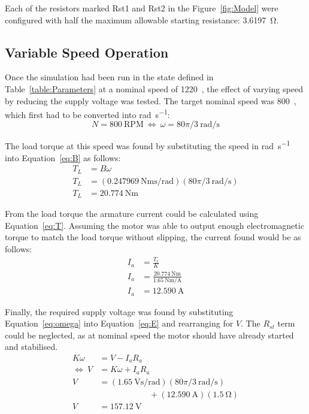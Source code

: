\documentclass[a4paper,11pt,twocolumn]{article}
\newcommand{\V}{\si{\volt}\xspace}
\newcommand{\A}{\si{\ampere}\xspace}
\newcommand{\Ohm}{\si{\ohm}\xspace}
\newcommand{\Nm}{\si{\newton\metre}\xspace}
\newcommand{\rps}{\si{\radian\per\second}\xspace}
\newcommand{\Vspr}{\si{\volt\second\per\radian}\xspace}
\newcommand{\NmpA}{\si{\newton\metre\per\ampere}\xspace}
\newcommand{\Nmspr}{\si{\newton\metre\second\per\radian}\xspace}
\newcommand{\RPM}{\text{RPM}\xspace}
\begin{document}
Each of the resistors marked Rst1 and Rst2 in the Figure~\vref{fig:Model} were 
configured with half the maximum allowable starting resistance: 3.6197~\Ohm.

\subsection{Variable Speed Operation}

Once the simulation had been run in the state defined in 
Table~\ref{table:Parameters} at a nominal speed of 1220~\RPM, the effect of 
varying speed by reducing the supply voltage was tested. The target nominal 
speed was 800~\RPM, which first had to be converted into \rps:
\begin{equation*}
    N = 800~\RPM~\Leftrightarrow~\omega = 80\pi/3~\rps
\end{equation*}

The load torque at this speed was found by substituting the speed in \rps into 
Equation~\vref{eq:B} as follows:
\begin{align*}
    T_L &= B\omega \\
    T_L &= (0.247969~\Nmspr)(80\pi/3~\rps) \\
    T_L &= 20.774~\Nm
\end{align*}

From the load torque the armature current could be calculated using 
Equation~\vref{eq:T}. Assuming the motor was able to output enough 
electromagnetic torque to match the load torque without slipping, the current 
found would be as follows:
\begin{align*}
    I_a &= \frac{T_e}{K} \\
    I_a &= \frac{20.774~\Nm}{1.65~\NmpA} \\
    I_a &= 12.590~\A
\end{align*}

Finally, the required supply voltage was found by substituting 
Equation~\ref{eq:omega} into Equation~\ref{eq:E} and rearranging for $V$. The 
$R_{st}$ term could be neglected, as at nominal speed the motor should have 
already started and stabilised.
\begin{align*}
    K \omega &= V - I_a R_a \\
    \Leftrightarrow~V &= K \omega + I_a R_a \\
    V &= (1.65~\Vspr)(80\pi/3~\rps) \\
        &\hspace{6em}+ (12.590~\A)(1.5~\Ohm) \\
    V &= 157.12~\V
\end{align*}
\end{document}

